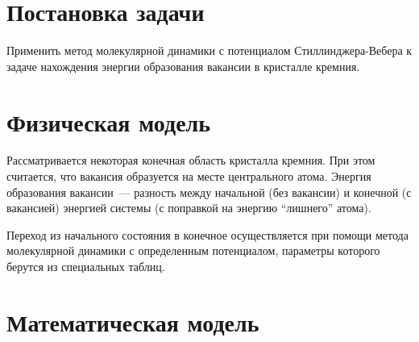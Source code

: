 \documentclass[12pt,a4paper]{article}
\begin{document}
    

    \tableofcontents

    \clearpage


    \section{Постановка задачи}

        Применить метод молекулярной динамики с потенциалом Стиллинджера-Вебера к задаче нахождения энергии образования вакансии в кристалле кремния.


    \section{Физическая модель}

        Рассматривается некоторая конечная область кристалла кремния. При этом считается, что вакансия образуется на месте центрального атома. Энергия образования вакансии~--- разность между начальной (без вакансии) и конечной (с вакансией) энергией системы (с поправкой на энергию \enquote{лишнего} атома).

        Переход из начального состояния в конечное осуществляется при помощи метода молекулярной динамики с определенным потенциалом, параметры которого берутся из специальных таблиц.


    \section{Математическая модель}

\end{document}
